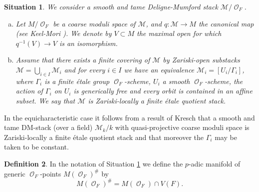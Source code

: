 \documentclass{article}
\newcommand{\Mc}{\mathcal{M}}
\DeclareMathOperator{\Oo}{\mathcal{O}}
\theoremstyle{definition}
\newtheorem{definition}{Definition}[section]
\theoremstyle{plain}
\newtheorem{situation}[definition]{Situation}
\begin{document}
\begin{situation}\label{situation:locally_quotient}
 We consider a smooth and tame Deligne-Mumford stack $\Mc/\Oo_F$. 
\begin{enumerate}[(a)]
\item Let $M/\Oo_F$ be a coarse moduli space of $\Mc$, and $q\colon \Mc \to M$ the canonical map (see Keel-Mori \cite{MR1432041}). We denote by $V \subset M$ the maximal open for which $q^{-1}(V) \to V$ is an isomorphism. 
\item Assume that there exists a finite covering of $\Mc$ by Zariski-open substacks $\Mc = \bigcup_{i \in I} \Mc_i$ and for every $i \in I$ we have an equivalence $\Mc_i = [U_i/\Gamma_i]$, where $\Gamma_i$ is a finite \'etale group $\Oo_F$-scheme, $U_i$ a smooth $\Oo_F$-scheme, the action of $\Gamma_i$ on $U_i$ is generically free and every orbit is contained in an affine subset. We say that $\Mc$ is Zariski-locally a finite \'etale quotient stack.


\end{enumerate}
\end{situation}



In the equicharacteristic case it follows from a result of Kresch \cite[Theorem 4.4 \& Proposition 5.2]{MR2483938} that a smooth and tame DM-stack (over a field) $\Mc_k/k$ with quasi-projective coarse moduli space is Zariski-locally a finite \'etale quotient stack and that moreover the $\Gamma_i$ may be taken to be constant.

\begin{definition} In the notation of Situation \ref{situation:locally_quotient} we define the $p$-adic manifold of generic $\Oo_F$-points $M(\Oo_F)^\#$ by 
\[ M(\Oo_F)^\# = M(\Oo_F) \cap V(F).\]
\end{definition}
\end{document}
